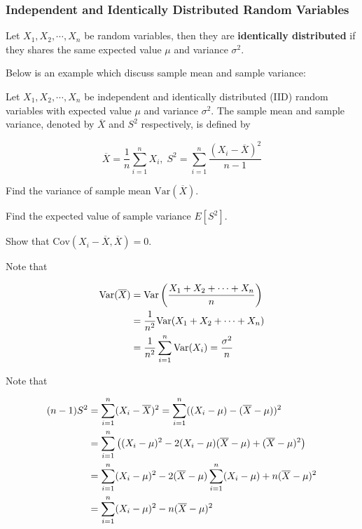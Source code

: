 \documentclass[a4paper,12pt]{article}
\begin{document}
\subsubsection{Independent and Identically Distributed Random Variables}
\begin{dft}
  Let $X_{1},X_{2},\cdots,X_{n}$ be random variables, then they are \textbf{identically distributed} if they shares the same expected value $\mu$ and variance $\sigma^{2}$.
\end{dft}\n

Below is an example which discuss sample mean and sample variance:\n

\begin{exm}
  Let $X_{1},X_{2},\cdots,X_{n}$ be independent and identically distributed (IID) random variables with expected value $\mu$ and variance $\sigma^{2}$. The sample mean and sample variance, denoted by $\overline{X}$ and $S^{2}$ respectively, is defined by

  $$\overline{X}=\frac{1}{n}\sum_{i=1}^{n}X_{i},\;S^{2}=\sum_{i=1}^{n}\frac{(X_{i}-\overline{X})^{2}}{n-1}$$

  \begin{alist}
    \item Find the variance of sample mean $\mathrm{Var}(\overline{X})$.
    \item Find the expected value of sample variance $E[S^{2}]$.
    \item Show that $\mathrm{Cov}(X_{i}-\overline{X},\overline{X})=0$.
  \end{alist}

  \ans{} Note that

  $$\begin{aligned}[t]
    \mathrm{Var}(\overline{X})&=\mathrm{Var}\left( \frac{X_{1}+X_{2}+\cdots+X_{n}}{n}\right)\\
    &=\frac{1}{n^{2}}\mathrm{Var}(X_{1}+X_{2}+\cdots+X_{n})\\
    &=\frac{1}{n^{2}}\sum_{i=1}^{n}\mathrm{Var}(X_{i})=\frac{\sigma^{2}}{n}
  \end{aligned}$$\s

   Note that

  $$\begin{aligned}[t]
    (n-1)S^{2}&=\sum_{i=1}^{n}(X_{i}-\overline{X})^{2}=\sum_{i=1}^{n}((X_{i}-\mu)-(\overline{X}-\mu))^{2}\\
    &=\sum_{i=1}^{n}\left( (X_{i}-\mu)^{2}-2(X_{i}-\mu)(\overline{X}-\mu)+(\overline{X}-\mu)^{2}\right)\\
    &=\sum_{i=1}^{n}(X_{i}-\mu)^{2}-2(\overline{X}-\mu)\sum_{i=1}^{n}(X_{i}-\mu)+n(\overline{X}-\mu)^{2}\\
    &=\sum_{i=1}^{n}(X_{i}-\mu)^{2}-n(\overline{X}-\mu)^{2}
  \end{aligned}$$\s


\end{exm}
\end{document}
